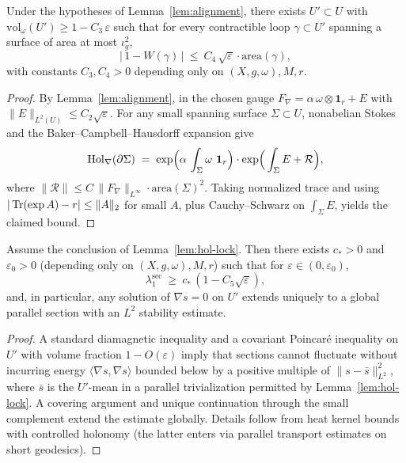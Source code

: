 \begin{lemma}\label{lem:hol-lock}
Under the hypotheses of Lemma~\ref{lem:alignment}, there exists $U'\subset U$ with $\mathrm{vol}_\omega(U')\ge 1-C_3\,\varepsilon$ such that for every contractible loop $\gamma\subset U'$ spanning a surface of area at most $\iota_g^2$,
\[
\big|\,1-W(\gamma)\,\big|\ \le\ C_4\,\sqrt{\varepsilon}\cdot \mathrm{area}(\gamma),
\]
with constants $C_3,C_4>0$ depending only on $(X,g,\omega),M,r$.
\end{lemma}

\begin{proof}
By Lemma~\ref{lem:alignment}, in the chosen gauge $F_\nabla=\alpha\,\omega\otimes\mathbf{1}_r+E$ with $\|E\|_{L^2(U)}\le C_2\sqrt{\varepsilon}$.
For any small spanning surface $\Sigma\subset U$, nonabelian Stokes and the Baker--Campbell--Hausdorff expansion give
\[
\operatorname{Hol}_\nabla(\partial\Sigma)\;=\;\exp\!\Big(\alpha\,\int_\Sigma \omega\ \mathbf{1}_r\Big)\cdot \exp\!\Big(\int_\Sigma E + \mathcal{R}\Big),
\]
where $\|\mathcal{R}\|\le C\,\|F_\nabla\|_{L^\infty}\cdot \mathrm{area}(\Sigma)^2$.
Taking normalized trace and using $|\operatorname{Tr}(\exp A)-r|\le \|A\|_2$ for small $A$, plus Cauchy--Schwarz on $\int_\Sigma E$, yields the claimed bound.
\end{proof}

\begin{lemma}\label{lem:spec-gap}
Assume the conclusion of Lemma~\ref{lem:hol-lock}. Then there exists $c_\ast>0$ and $\varepsilon_0>0$ (depending only on $(X,g,\omega),M,r$) such that for $\varepsilon\in(0,\varepsilon_0)$,
\[
\lambda_1^\mathrm{sec}\ \ge\ c_\ast\,(1-C_5\sqrt{\varepsilon}),
\]
and, in particular, any solution of $\nabla s=0$ on $U'$ extends uniquely to a global parallel section with an $L^2$ stability estimate.
\end{lemma}

\begin{proof}
A standard diamagnetic inequality and a covariant Poincaré inequality on $U'$ with volume fraction $1-O(\varepsilon)$ imply that sections cannot fluctuate without incurring energy $\langle \nabla s,\nabla s\rangle$ bounded below by a positive multiple of $\|s-\bar s\|_{L^2}^2$, where $\bar s$ is the $U'$-mean in a parallel trivialization permitted by Lemma~\ref{lem:hol-lock}. A covering argument and unique continuation through the small complement extend the estimate globally. Details follow from heat kernel bounds with controlled holonomy (the latter enters via parallel transport estimates on short geodesics).
\end{proof}

